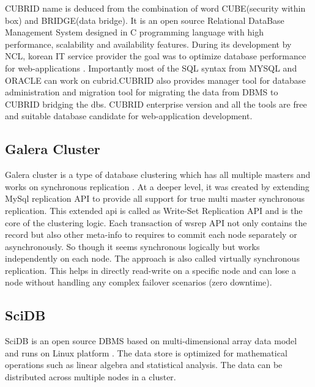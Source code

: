      CUBRID name is deduced from the combination of word CUBE(security
     within box) and BRIDGE(data bridge).  It is an open source
     Relational DataBase Management System designed in C programming
     language with high performance, scalability and availability
     features. During its development by NCL, korean IT service
     provider the goal was to optimize database performance for
     web-applications \cite{www-cubrid}. Importantly most of the SQL
     syntax from MYSQL and ORACLE can work on cubrid.CUBRID also
     provides manager tool for database administration and migration
     tool for migrating the data from DBMS to CUBRID bridging the dbs.
     CUBRID enterprise version and all the tools are free and suitable
     database candidate for web-application development.

     \pv

\subsection{Galera Cluster}

     Galera cluster is a type of database
     clustering which has all multiple masters and works on
     synchronous replication \cite{www-galera-cluster}.
     At a deeper level, it was created by
     extending MySql replication API to provide all support for true
     multi master synchronous replication.  This extended api is
     called as Write-Set Replication API and is the core of the
     clustering logic.  Each transaction of wsrep API not only
     contains the record but also other meta-info to requires to
     commit each node separately or asynchronously. So though it seems
     synchronous logically but works independently on each node.  The
     approach is also called virtually synchronous replication. This
     helps in directly read-write on a specific node and can lose a
     node without handling any complex failover scenarios (zero
     downtime).

     \pv

\subsection{SciDB}

     SciDB is an open source DBMS based on multi-dimensional array data model
     and runs on Linux platform \cite{ercimnews}. The data store is optimized
     for mathematical operations such as linear algebra and statistical
     analysis. The data can be distributed across multiple nodes in a cluster. 

